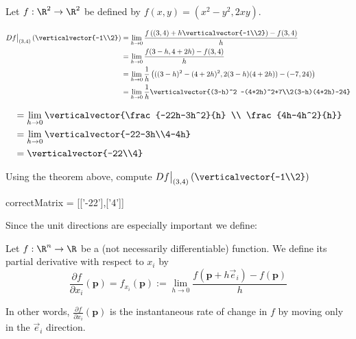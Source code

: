 \documentclass{ximera}
\begin{document}
	\begin{question}
		Let $f:\R^2 \to \R^2$ be defined by $f(x,y)=(x^2-y^2,2xy)$.
			\begin{solution}
				\begin{hint}
					\begin{align*}
						  Df\big|_{(3,4)}\left(\verticalvector{-1\\2}\right) &= \lim_{h \to 0} \frac{f\left((3,4)+h\verticalvector{-1\\2}\right) - f(3,4)}{h}\\
						  &= \lim_{h \to 0} \frac{f(3-h,4+2h)-f(3,4)}{h}\\
						  &= \lim_{h \to 0}\frac{1}{h} \left( ((3-h)^2 -(4+2h)^2,2(3-h)(4+2h)) - (-7,24)\right) \\
						  &=\lim_{h \to 0}\frac{1}{h} \verticalvector{(3-h)^2 -(4+2h)^2+7\\2(3-h)(4+2h)-24}
					\end{align*}
				\end{hint}
				\begin{hint}
					\begin{align*}
						&=\lim_{h \to 0}\verticalvector{\frac{-22h-3h^2}{h} \\ \frac{4h-4h^2}{h}}\\
						&=\lim_{h \to 0}\verticalvector{-22-3h\\4-4h}\\
						&=\verticalvector{-22\\4}
					\end{align*}
				\end{hint}
				Using the theorem above, compute $Df\big|_{(3,4)}\left(\verticalvector{-1\\2}\right)$
				\begin{matrix-answer}
					correctMatrix = [['-22'],['4']]
				\end{matrix-answer}
			\end{solution}
	\end{question}

	Since the unit directions are especially important we define:
	
	\begin{definition}
		Let $f: \R^n \to \R$ be a (not necessarily differentiable) function.  We define its partial derivative with respect to $x_i$ by
		\[
			\frac{\partial f}{\partial x_i} (\mathbf{p}) = f_{x_i}(\mathbf{p}) := \lim_{h \to 0} \frac{f(\mathbf{p}+h\vec{e}_i)-f(\mathbf{p})}{h}
		\]
		
		In other words, $\frac{\partial f}{\partial x_i} (\mathbf{p})$ is the instantaneous rate of change in $f$ by moving only in the $\vec{e}_i$ direction.
	\end{definition}	
	
\end{document}
